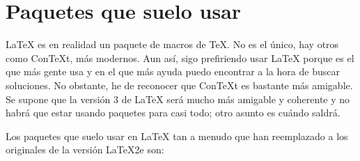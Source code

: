 \section{Paquetes que suelo usar}\label{sec:tex-package}
\LaTeX{} es en realidad un paquete de macros de \TeX. No es el único, hay otros como ConTeXt, más modernos. Aun
así, sigo prefiriendo usar \LaTeX{} porque es el que más gente usa y en el que más ayuda puedo encontrar a la
hora de buscar soluciones. No obstante, he de reconocer que ConTeXt es bastante más amigable. Se supone que la
versión 3 de \LaTeX{} será mucho más amigable y coherente y no habrá que estar usando paquetes para casi todo;
otro asunto es cuándo saldrá.

Los paquetes que suelo usar en \LaTeX{} tan a menudo que han reemplazado a los originales de la versión
\LaTeX{}2e son:

